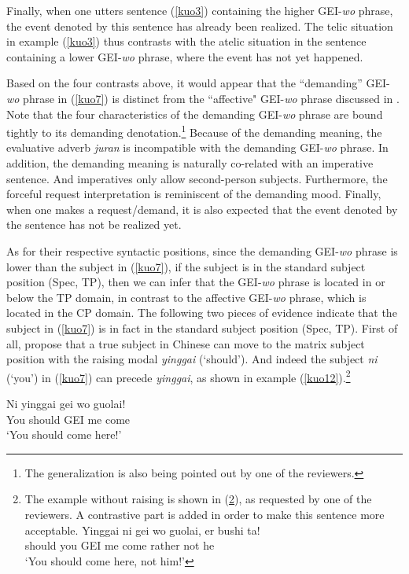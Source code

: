 \documentclass[output=paper,colorlinks,citecolor=brown]{langscibook}
\begin{document}
Finally, when one utters sentence (\ref{kuo3}) containing the higher GEI-\textit{wo} phrase, the event denoted by this sentence has already been realized. The telic situation in example (\ref{kuo3}) thus contrasts with the atelic situation in the sentence containing a lower GEI-\textit{wo} phrase, where the event has not yet happened.

Based on the four contrasts above, it would appear that the ``demanding'' GEI-\textit{wo} phrase in (\ref{kuo7}) is distinct from the “affective" GEI-\textit{wo} phrase discussed in \citet{Tsai2017}. Note that the four characteristics of the demanding GEI-\textit{wo} phrase are bound tightly to its demanding denotation.\footnote{The generalization is also being pointed out by one of the reviewers.} Because of the demanding meaning, the evaluative adverb \textit{juran} is incompatible with the demanding GEI-\textit{wo} phrase. In addition, the demanding meaning is naturally co-related with an imperative sentence. And imperatives only allow second-person subjects. Furthermore, the forceful request interpretation is reminiscent of the demanding mood. Finally, when one makes a request/demand, it is also expected that the event denoted by the sentence has not be realized yet.

As for their respective syntactic positions, since the demanding GEI-\textit{wo} phrase is lower than the subject in (\ref{kuo7}), if the subject is in the standard subject position (Spec, TP), then we can infer that the GEI-\textit{wo} phrase is located in or below the TP domain, in contrast to the affective GEI-\textit{wo} phrase, which is located in the CP domain. The following two pieces of evidence indicate that the subject in (\ref{kuo7}) is in fact in the standard subject position (Spec, TP). First of all, \citet{Lin&Tang1995} propose that a true subject in Chinese can move to the matrix subject position with the raising modal \textit{yinggai} (`should'). And indeed the subject \textit{ni} (`you') in (\ref{kuo7}) can precede \textit{yinggai}, as shown in example (\ref{kuo12}).\footnote{The example without raising is shown in (\ref{kuoi}), as requested by one of the reviewers. A contrastive part is added in order to make this sentence more acceptable. 
\ea
\label{kuoi}
\gll    Yinggai	ni 	gei wo 	guolai, 	er 		bushi 	ta! \\ 
        should	you	GEI	me	come	rather	not		he\\
\glt    `You should come here, not him!'
\z
}

\ea
\label{kuo12}
\gll Ni     yinggai gei wo  guolai!\\  
     You    should  GEI me  come\\ 
\glt `You should come here!'
\z
\end{document}
